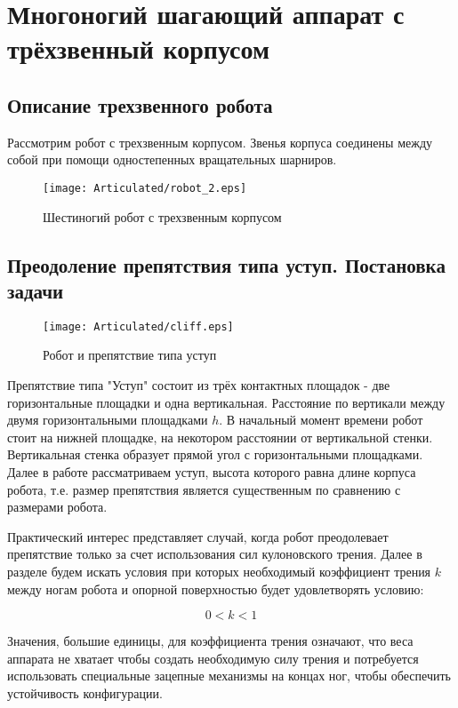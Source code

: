 
\chapter{Многоногий шагающий аппарат с трёхзвенный корпусом}
\section{Описание трехзвенного робота}

Рассмотрим робот с трехзвенным корпусом. Звенья корпуса соединены между собой при помощи одностепенных вращательных шарниров. 

\begin{figure}[ht]
  \centering
  \texttt{[image: Articulated/robot\_2.eps]}
  \caption{Шестиногий робот с трехзвенным корпусом}
  \label{articulated:fig:robot}
\end{figure}


\section{Преодоление препятствия типа уступ. Постановка задачи}

\begin{figure}[ht]
  \centering
  \texttt{[image: Articulated/cliff.eps]}
  \caption{Робот и препятствие типа уступ}
  \label{img:cliff}
\end{figure}

Препятствие типа "Уступ" состоит из трёх контактных площадок - две горизонтальные площадки и одна вертикальная. Расстояние по вертикали между двумя горизонтальными площадками $h$. В начальный момент времени робот стоит на нижней площадке, на некотором расстоянии от вертикальной стенки. Вертикальная стенка образует прямой угол с горизонтальными площадками. Далее в работе рассматриваем уступ, высота которого равна длине корпуса робота, т.е. размер препятствия является существенным по сравнению с размерами робота.

Практический интерес представляет случай, когда робот преодолевает препятствие только за счет использования сил кулоновского трения. Далее в разделе будем искать условия при которых необходимый коэффициент трения $k$ между ногам робота и опорной поверхностью будет удовлетворять условию:

\begin{equation}
\label{articulated:k_condition}
  0 < k < 1
\end{equation}

Значения, большие единицы, для коэффициента трения означают, что веса аппарата не хватает чтобы создать необходимую силу трения и потребуется использовать специальные зацепные механизмы на концах ног, чтобы обеспечить устойчивость конфигурации.

